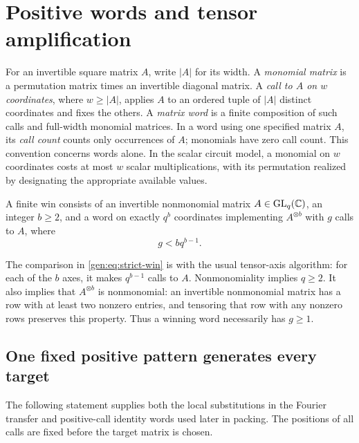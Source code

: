 \section{Positive words and tensor amplification}
\label{gen:sec:generation}

For an invertible square matrix $A$, write $|A|$ for its width.
A \emph{monomial matrix} is a permutation matrix times an invertible
diagonal matrix.  A \emph{call to $A$ on $w$ coordinates}, where $w\geq
|A|$, applies $A$ to an ordered tuple of $|A|$ distinct coordinates and
fixes the others.  A \emph{matrix word} is a finite composition of such
calls and full-width monomial matrices.  In a word using one specified
matrix $A$, its \emph{call count} counts only occurrences of $A$;
monomials have zero call count.  This convention concerns words alone.
In the scalar circuit model, a monomial on $w$ coordinates costs at most
$w$ scalar multiplications, with its permutation realized by designating
the appropriate available values.

\begin{definition}\label{def:finite-win}
A finite win consists of an invertible nonmonomial matrix
$A\in\operatorname{GL}_q(\mathbb C)$, an integer $b\geq2$, and a word on exactly $q^b$
coordinates implementing $A^{\otimes b}$ with $g$ calls to $A$, where
\begin{equation}\label{gen:eq:strict-win}
g<bq^{b-1}.
\end{equation}
\end{definition}

The comparison in \cref{gen:eq:strict-win} is with the usual tensor-axis
algorithm: for each of the $b$ axes, it makes $q^{b-1}$ calls to $A$.
Nonmonomiality implies $q\geq2$.  It also implies that $A^{\otimes b}$
is nonmonomial: an invertible nonmonomial matrix has a row with at least
two nonzero entries, and tensoring that row with any nonzero rows
preserves this property.  Thus a winning word necessarily has $g\geq1$.

\subsection{One fixed positive pattern generates every target}

The following statement supplies both the local substitutions in the
Fourier transfer and positive-call identity words used later in packing.
The positions of all calls are fixed before the target matrix is chosen.


